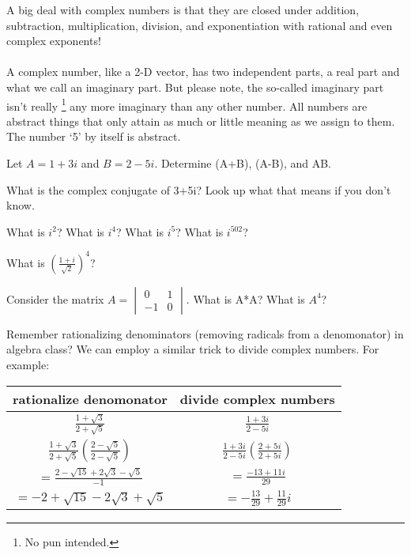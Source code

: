 A big deal with complex numbers is that they are closed under addition, subtraction, multiplication, division, and exponentiation with rational and even complex exponents!\\
\\
A complex number, like a 2-D vector, has two independent parts, a real part and what we call an imaginary part. But please note, the so-called imaginary part isn't really \footnote{No pun intended.} any more imaginary than any other number. All numbers are abstract things that only attain as much or little meaning as we assign to them. The number `5' by itself is abstract. 

\begin{alevel}
Let $A = 1+3i$ and $B=2-5i$. Determine (A+B), (A-B), and AB.
\end{alevel}

\begin{alevel}
What is the complex conjugate of 3+5i? Look up what that means if you don't know.
\end{alevel}

\begin{blevel}
What is $i^2$? What is $i^4$? What is $i^5$? What is $i^{502}$? 
\end{blevel}

\begin{clevel}
What is $(\frac{1+i}{\sqrt{2}})^4$? 
\end{clevel}

\begin{clevel}
Consider the matrix $A=\begin{vmatrix} 0&1 \\ -1&0\end{vmatrix}$. What is A*A? What is $A^4$? 
\end{clevel}

Remember rationalizing denominators (removing radicals from a denomonator) in algebra class? We can employ a similar trick to divide complex numbers. For example:\par

\begin{table}[H]
\begin{center}
\begin{tabular}{c|c}
rationalize denomonator&divide complex numbers\\ \hline
$\frac{1+\sqrt{3}}{2+\sqrt{5}}$&	$\frac{1+3i}{2-5i}$\\
$\frac{1+\sqrt{3}}{2+\sqrt{5}}(\frac{2-\sqrt{5}}{2-\sqrt{5}})$&	$\frac{1+3i}{2-5i}(\frac{2+5i}{2+5i})$\\
$=\frac{2-\sqrt{15}+2\sqrt{3}-\sqrt{5}}{-1}$&$=\frac{-13+11i}{29}$\\
$=-2+\sqrt{15}-2\sqrt{3}+\sqrt{5}$&	$=-\frac{13}{29}+\frac{11}{29}i$
\end{tabular}
\end{center}
\end{table}


